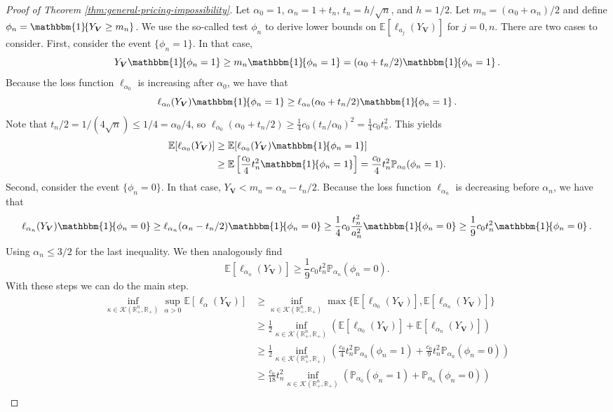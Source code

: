 \documentclass[11pt]{article}
\newcommand{\E}{\mathbb{E}}
\newcommand{\Rplus}{\mathbb{R}_+}
\newcommand{\Prob}{\mathbb{P}}
\newcommand{\indicator}[1]{\mathbbm{1}\!\!\left\{#1\right\}}
\begin{document}
\begin{proof}[Proof of Theorem \ref{thm:general-pricing-impossibility}]
Let $\alpha_0=1$, $\alpha_n=1+t_n$, $t_n=h/\sqrt{n}$, and $h=1/2$. Let $m_n=(\alpha_0+\alpha_n)/2$ and define $\phi_n=\indicator{Y_{\boldsymbol{V}}\ge m_n}$. We use the so-called test $\phi_n$ to derive lower bounds on $\E[\ell_{a_j}(Y_{\boldsymbol{V}})]$ for $j = 0,n$. There are two cases to consider.
First, consider the event $\{\phi_n=1\}$. In that case, 
$$Y_{\boldsymbol{V}}\indicator{\phi_n = 1}\ge m_n\indicator{\phi_n = 1}=(\alpha_0+t_n/2)\indicator{\phi_n = 1}.$$ 
Because the loss function $\ell_{\alpha_0}$ is increasing after $\alpha_0$, we have that 
$$\ell_{\alpha_0}(Y_{\boldsymbol{V}})\indicator{\phi_n = 1}\ge\ell_{\alpha_0}(\alpha_0+t_n/2)\indicator{\phi_n = 1}.$$ 
Note that $t_n/2=1/(4\sqrt{n})\le 1/4= \alpha_0/4$, so $\ell_{\alpha_0}(\alpha_0+t_n/2)\ge \frac{1}{4}c_0(t_n/\alpha_0)^2=\frac{1}{4}c_0t_n^2$. This yields
\begin{align*}
    \E[\ell_{\alpha_0}(Y_{\boldsymbol{V}})]&\ge \E[\ell_{\alpha_0}(Y_{\boldsymbol{V}})\indicator{\phi_n=1}]
    \\
    &\ge \E\left[\frac{c_0}{4}t_n^2\indicator{\phi_n=1}\right]=\frac{c_0}{4}t_n^2\Prob_{\alpha_0}(\phi_n=1).
\end{align*}
Second, consider the event $\{\phi_n=0\}$. In that case, $Y_{\boldsymbol{V}}<m_n=\alpha_n-t_n/2$. Because the loss function $\ell_{\alpha_n}$ is decreasing before $\alpha_n$, we have that 
$$
\ell_{\alpha_n}(Y_{\boldsymbol{V}})\indicator{\phi_n = 0}\ge \ell_{\alpha_n}(\alpha_n-t_n/2)\indicator{\phi_n = 0}\ge\frac{1}{4}c_0\frac{t_n^2}{a_n^2}\indicator{\phi_n = 0}\ge \frac{1}{9}c_0t_n^2\indicator{\phi_n = 0}.
$$
Using $\alpha_n\le3/2$ for the last inequality. We then analogously find
$$
\E[\ell_{\alpha_n}(Y_{\boldsymbol{V}})]\ge \frac{1}{9}c_0t_n^2\Prob_{\alpha_n}(\phi_n=0).
$$
With these steps we can do the main step.
\begin{align*}
    \inf_{\kappa\in \mathcal{K}(\Rplus^n,\Rplus)}\sup_{\alpha>0}\E[\ell_{\alpha}(Y_{\boldsymbol{V}})]&\ge \inf_{\kappa\in \mathcal{K}(\Rplus^n,\Rplus)}\max\{\E[\ell_{\alpha_0}(Y_{\boldsymbol{V}})],\E[\ell_{\alpha_n}(Y_{\boldsymbol{V}})]\}\\
    &\ge \frac{1}{2}\inf_{\kappa\in \mathcal{K}(\Rplus^n,\Rplus)}(\E[\ell_{\alpha_0}(Y_{\boldsymbol{V}})]+\E[\ell_{\alpha_n}(Y_{\boldsymbol{V}})])\\
    &\ge \frac{1}{2}\inf_{\kappa\in \mathcal{K}(\Rplus^n,\Rplus)}\left(\frac{c_0}{4}t_n^2\Prob_{\alpha_0}(\phi_n=1)+\frac{c_0}{9}t_n^2\Prob_{\alpha_n}(\phi_n=0)\right)\\
    &\ge \frac{c_0}{18}t_n^2\inf_{\kappa\in \mathcal{K}(\Rplus^n,\Rplus)}\left(\Prob_{\alpha_0}(\phi_n=1)+\Prob_{\alpha_n}(\phi_n=0)\right)\\

\end{align*}
\end{proof}
\end{document}
